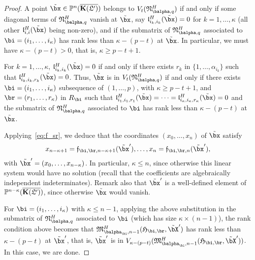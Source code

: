 \documentclass[12pt]{article}
\begin{document}
\begin{proof}
  A point $\tilde\bx \in \P^n(\KKGpbar)$ belongs to
  $V_t(\mathfrak{N}^H_{\balpha,q})$ if and only if some diagonal terms
  of $\mathfrak{N}^H_{\balpha,q}$ vanish at $\tilde\bx$, say
  $\mathfrak{l}^H_{i_k,i_k}(\tilde\bx)=0$ for $k=1,\dots,\kappa$ (all
  other $\mathfrak{l}^H_{i,i}(\tilde\bx)$ being non-zero), and
  if the submatrix of $\mathfrak{N}^H_{\balpha,q}$ associated to
  $\bi=(i_1,\dots,i_\kappa)$ has rank less than $\kappa-(p-t)$ at $\tilde
  \bx$.  In particular, we must have
  $\kappa-(p-t) > 0$, that is, $\kappa \ge p-t+1$.

  For $k=1,\dots,\kappa$, $\mathfrak{l}^H_{i_k,i_k}(\tilde\bx)=0$ if
  and only if there exists $r_k$ in $\{1,\dots,\alpha_{i_k}\}$ such
  that $\mathfrak{l}^H_{i_k,i_k,r_k}(\tilde\bx)=0$. Thus, $\tilde\bx$
  is in $V_t(\mathfrak{N}^H_{\balpha,q})$ if and only if there exists
  $\bi=(i_1,\dots,i_\kappa)$ subsequence of $(1,\dots,p)$, with
  $\kappa \ge p-t+1$, and $\br=(r_1,\dots,r_\kappa)$ in $R_\bi$ such that
  $\mathfrak{l}^H_{i_1,i_1,r_1}(\tilde\bx)=\cdots=\mathfrak{l}^H_{i_\kappa,i_\kappa,r_\kappa}(\tilde\bx)=0$
  and the submatrix of $\mathfrak{N}^H_{\balpha,q}$ associated to $\bi$
  has rank less than $\kappa-(p-t)$ at $\tilde\bx$.  

  Applying~\eqref{eq:f_sr}, we deduce that the coordinates $(x_0,\dots,x_n)$ 
  of $\tilde \bx$ satisfy
  \begin{align*}
    x_{n-\kappa+1}=\mathfrak{f}_{\bi,\br,n-\kappa+1}(\tilde\bx'),\dots,x_{n}=\mathfrak{f}_{\bi,\br,n}(\tilde\bx'),
  \end{align*}
  with $\tilde\bx'=(x_0,\dots,x_{n-\kappa})$.  In particular, $\kappa
  \le n$, since otherwise this linear system would have no solution
  (recall that the coefficients are algebraically independent
  indeterminates). Remark also that $\tilde\bx'$ is a well-defined
  element of $\mathbb{P}^{n-\kappa}(\overline{\mathbf{K}(\mathfrak{L}')})$, since otherwise $\tilde\bx$ would
  vanish.

  For $\bi=(i_1,\dots,i_\kappa)$ with $\kappa \le n-1$, applying the above
  substitution in the submatrix of $\mathfrak{N}^H_{\balpha,q}$
  associated to $\bi$ (which has size $\kappa \times (n-1)$), the rank
  condition above becomes that
  $\mathfrak{M}^H_{\balpha_\bi,n-1}(\mathfrak{H}_{\bi,\br},\tilde\bX')$
  has rank less than $\kappa-(p-t)$ at $\tilde \bx'$, that is, $\tilde
  \bx'$ is in
  $V_{\kappa-(p-t)}(\mathfrak{M}^H_{\balpha_\bi,n-1}(\mathfrak{H}_{\bi,\br},\tilde\bX'))$.
  In this case, we are done.


\end{proof}
\end{document}
